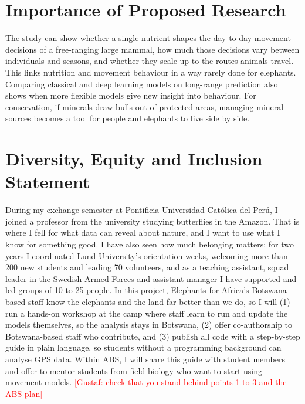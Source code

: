 \documentclass[11pt,a4paper]{article}
\newcommand{\fixme}[1]{\textcolor{red}{[#1]}}
\begin{document}
\section{Importance of Proposed Research}
The study can show whether a single nutrient shapes the day-to-day movement decisions of a free-ranging large mammal, how much those decisions vary between individuals and seasons, and whether they scale up to the routes animals travel. This links nutrition and movement behaviour in a way rarely done for elephants. Comparing classical and deep learning models on long-range prediction also shows when more flexible models give new insight into behaviour. For conservation, if minerals draw bulls out of protected areas, managing mineral sources becomes a tool for people and elephants to live side by side.

\section{Diversity, Equity and Inclusion Statement}
During my exchange semester at Pontificia Universidad Católica del Perú, I joined a professor from the university studying butterflies in the Amazon. That is where I fell for what data can reveal about nature, and I want to use what I know for something good. I have also seen how much belonging matters: for two years I coordinated Lund University's orientation weeks, welcoming more than 200 new students and leading 70 volunteers, and as a teaching assistant, squad leader in the Swedish Armed Forces and assistant manager I have supported and led groups of 10 to 25 people. In this project, Elephants for Africa's Botswana-based staff know the elephants and the land far better than we do, so I will (1) run a hands-on workshop at the camp where staff learn to run and update the models themselves, so the analysis stays in Botswana, (2) offer co-authorship to Botswana-based staff who contribute, and (3) publish all code with a step-by-step guide in plain language, so students without a programming background can analyse GPS data. Within ABS, I will share this guide with student members and offer to mentor students from field biology who want to start using movement models. \fixme{Gustaf: check that you stand behind points 1 to 3 and the ABS plan}
\end{document}
